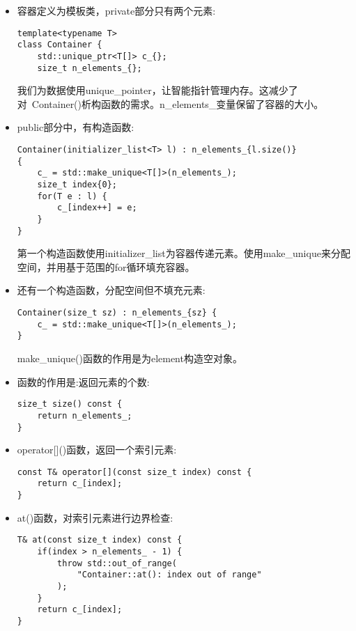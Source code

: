 \begin{itemize}
\item 
容器定义为模板类，private部分只有两个元素:

\begin{lstlisting}[style=styleCXX]
template<typename T>
class Container {
	std::unique_ptr<T[]> c_{};
	size_t n_elements_{};
\end{lstlisting}

我们为数据使用unique\_pointer，让智能指针管理内存。这减少了对~Container()析构函数的需求。n\_elements\_变量保留了容器的大小。

\item 
public部分中，有构造函数:

\begin{lstlisting}[style=styleCXX]
Container(initializer_list<T> l) : n_elements_{l.size()}
{
	c_ = std::make_unique<T[]>(n_elements_);
	size_t index{0};
	for(T e : l) {
		c_[index++] = e;
	}
}
\end{lstlisting}

第一个构造函数使用initializer\_list为容器传递元素。使用make\_unique来分配空间，并用基于范围的for循环填充容器。

\item 
还有一个构造函数，分配空间但不填充元素:

\begin{lstlisting}[style=styleCXX]
Container(size_t sz) : n_elements_{sz} {
	c_ = std::make_unique<T[]>(n_elements_);
}
\end{lstlisting}

make\_unique()函数的作用是为element构造空对象。

\item 
函数的作用是:返回元素的个数:

\begin{lstlisting}[style=styleCXX]
size_t size() const {
	return n_elements_;
}
\end{lstlisting}

\item 
operator[]()函数，返回一个索引元素:

\begin{lstlisting}[style=styleCXX]
const T& operator[](const size_t index) const {
	return c_[index];
}
\end{lstlisting}

\item 
at()函数，对索引元素进行边界检查:

\begin{lstlisting}[style=styleCXX]
T& at(const size_t index) const {
	if(index > n_elements_ - 1) {
		throw std::out_of_range(
			"Container::at(): index out of range"
		);
	}
	return c_[index];
}
\end{lstlisting}


\end{itemize}
